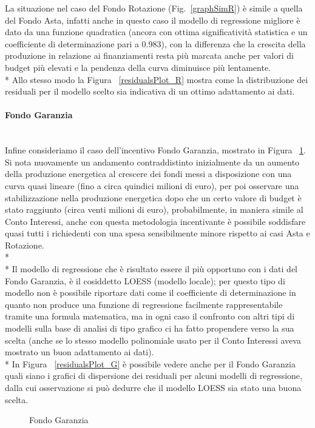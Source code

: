 \documentclass[12pt,a4paper,openright,twoside]{report}
\newcommand{\myparagraph}[1]{\paragraph{#1}\mbox{}\\}
\begin{document}
La situazione nel caso del Fondo Rotazione (Fig.~\ref{graphSimR}) è simile a quella del Fondo Asta, infatti anche in questo caso il modello di regressione migliore è dato da una funzione quadratica (ancora con ottima significatività statistica e un coefficiente di determinazione pari a 0.983), con la differenza che la crescita della produzione in relazione ai finanziamenti resta più marcata anche per valori di budget più elevati e la pendenza della curva diminuisce più lentamente.\\*
Allo stesso modo la Figura ~\ref{residualsPlot_R} mostra come la distribuzione dei residuali per il modello scelto sia indicativa di un ottimo adattamento ai dati.

\myparagraph{Fondo Garanzia}

Infine consideriamo il caso dell'incentivo Fondo Garanzia, mostrato in Figura ~\ref{graphSimG}. Si nota nuovamente un andamento contraddistinto inizialmente da un aumento della produzione energetica al crescere dei fondi messi a disposizione con una curva quasi lineare (fino a circa quindici milioni di euro), per poi osservare una stabilizzazione nella produzione energetica dopo che un certo valore di budget è stato raggiunto (circa venti milioni di euro), probabilmente, in maniera simile al Conto Interessi, anche con questa metodologia incentivante è possibile soddisfare quasi tutti i richiedenti con una spesa sensibilmente minore rispetto ai casi Asta e Rotazione.\\*\\*
Il modello di regressione che è risultato essere il più opportuno con i dati del Fondo Garanzia, è il cosiddetto LOESS (modello locale); per questo tipo di modello non è possibile riportare dati come il coefficiente di determinazione in quanto non produce una funzione di regressione facilmente rappresentabile tramite una formula matematica, ma in ogni caso il confronto con altri tipi di modelli sulla base di analisi di tipo grafico ci ha fatto propendere verso la sua scelta (anche se lo stesso modello polinomiale usato per il Conto Interessi aveva mostrato un buon adattamento ai dati).\\*
In Figura ~\ref{residualsPlot_G} è possibile vedere anche per il Fondo Garanzia quali siano i grafici di dispersione dei residuali per alcuni modelli di regressione, dalla cui osservazione si può dedurre che il modello LOESS sia stato una buona scelta.

\begin{figure}[H]
	\centering
	\qquad
	\caption{Fondo Garanzia}
	\label{graphSimG}
\end{figure}
\end{document}
